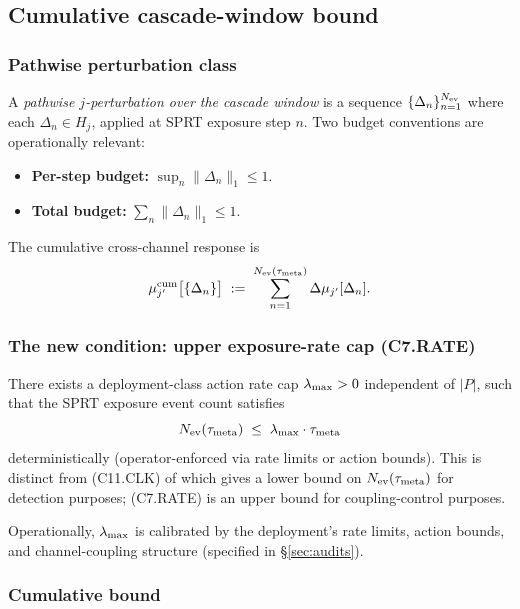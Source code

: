 \subsection{Cumulative cascade-window bound}

\subsubsection{Pathwise perturbation class}

A \emph{pathwise $j$-perturbation over the cascade window} is a
sequence $\{\Delta_n\}_{n=1}^{N_{\mathrm{ev}}}$ where each
$\Delta_n \in H_j$, applied at SPRT exposure step $n$. Two
budget conventions are operationally relevant:
\begin{itemize}
\item \textbf{Per-step budget:} $\sup_n \|\Delta_n\|_1 \leq 1$.
\item \textbf{Total budget:} $\sum_n \|\Delta_n\|_1 \leq 1$.
\end{itemize}

The cumulative cross-channel response is
\[
  \mu_{j'}^{\mathrm{cum}}\big[\{\Delta_n\}\big]
  \;:=\; \sum_{n=1}^{N_{\mathrm{ev}}(\tau_{\mathrm{meta}})} \Delta\mu_{j'}[\Delta_n].
\]

\subsubsection{The new condition: upper exposure-rate cap (C7.RATE)}

\begin{assumption}
\label{ass:c7-rate}
There exists a deployment-class action rate cap $\lambda_{\max} > 0$
independent of $|P|$, such that the SPRT exposure event count
satisfies
\begin{equation}
\label{eq:c7-rate-companion}
  N_{\mathrm{ev}}(\tau_{\mathrm{meta}}) \;\leq\; \lambda_{\max} \cdot \tau_{\mathrm{meta}}
\end{equation}
deterministically (operator-enforced via rate limits or action
bounds). This is distinct from (C11.CLK) of
\citep[Deployment Safety]{lasser2026paper10} which gives a lower bound on
$N_{\mathrm{ev}}(\tau_{\mathrm{meta}})$ for detection purposes; (C7.RATE) is an upper
bound for coupling-control purposes.

Operationally, $\lambda_{\max}$ is calibrated by the deployment's rate
limits, action bounds, and channel-coupling structure (specified
in \S\ref{sec:audits}).
\end{assumption}

\subsubsection{Cumulative bound}

